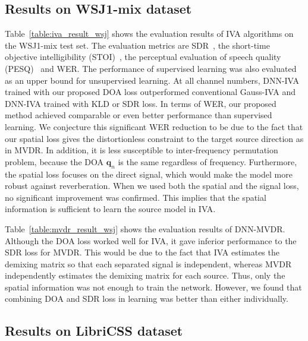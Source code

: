 \documentclass[a4paper]{article}
\begin{document}
\subsection{Results on WSJ1-mix dataset}
\label{subsec:result_wsj}
Table~\ref{table:iva_result_wsj} shows the evaluation results of IVA algorithms on the WSJ1-mix test set. 
The evaluation metrics are SDR~\cite{vincentPerformanceMeasurementBlind2006,sdrmedium}, the short-time objective intelligibility (STOI)~\cite{stoi}, the perceptual evaluation of speech quality (PESQ)~\cite{pesq} and WER.
The performance of supervised learning was also evaluated as an upper bound for unsupervised learning.
At all channel numbers, DNN-IVA trained with our proposed DOA loss outperformed conventional Gauss-IVA and DNN-IVA trained with KLD or SDR loss.
In terms of WER, our proposed method achieved comparable or even better performance than supervised learning.
We conjecture this significant WER reduction to be due to the fact that our spatial loss gives the distortionless constraint to the target source direction as in MVDR.
In addition, it is less susceptible to inter-frequency permutation problem, because the DOA $\bm{q}_{n}$ is the same regardless of  frequency.
Furthermore, the spatial loss focuses on the direct signal, which would make the model more robust against reverberation.
When we used both the spatial and the signal loss, no significant improvement was confirmed.
This implies that the spatial information is sufficient to learn the source model in IVA.

Table~\ref{table:mvdr_result_wsj} shows the evaluation results of DNN-MVDR.
Although the DOA loss worked well for IVA, it gave inferior performance to the SDR loss for MVDR.
This would be due to the fact that IVA estimates the demixing matrix so that each separated signal is independent, whereas MVDR independently estimates the demixing matrix for each source.
Thus, only the spatial information was not enough to train the network.
However, we found that combining DOA and SDR loss in learning was better than either individually.

\subsection{Results on LibriCSS dataset}
\label{subsec:result_libricss}
\end{document}
